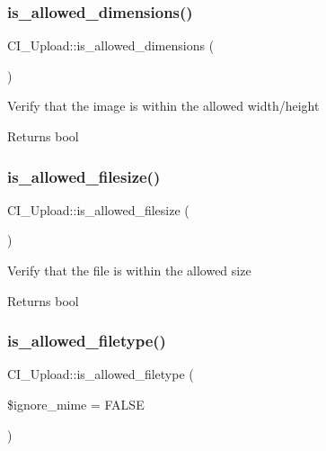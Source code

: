 \subsubsection{\texorpdfstring{is\+\_\+allowed\+\_\+dimensions()}{is\_allowed\_dimensions()}}
{\footnotesize\ttfamily C\+I\+\_\+\+Upload\+::is\+\_\+allowed\+\_\+dimensions (\begin{DoxyParamCaption}{ }\end{DoxyParamCaption})}

Verify that the image is within the allowed width/height

\begin{DoxyReturn}{Returns}
bool 
\end{DoxyReturn}
\mbox{\label{class_c_i___upload_af0538419d2efbf52b5a48dbeb423f909}} 
\subsubsection{\texorpdfstring{is\+\_\+allowed\+\_\+filesize()}{is\_allowed\_filesize()}}
{\footnotesize\ttfamily C\+I\+\_\+\+Upload\+::is\+\_\+allowed\+\_\+filesize (\begin{DoxyParamCaption}{ }\end{DoxyParamCaption})}

Verify that the file is within the allowed size

\begin{DoxyReturn}{Returns}
bool 
\end{DoxyReturn}
\mbox{\label{class_c_i___upload_adecf3ad0a635aaecb9fa4cb2c73dbe24}} 
\subsubsection{\texorpdfstring{is\+\_\+allowed\+\_\+filetype()}{is\_allowed\_filetype()}}
{\footnotesize\ttfamily C\+I\+\_\+\+Upload\+::is\+\_\+allowed\+\_\+filetype (\begin{DoxyParamCaption}\item[{}]{\$ignore\+\_\+mime = {\ttfamily FALSE} }\end{DoxyParamCaption})}

